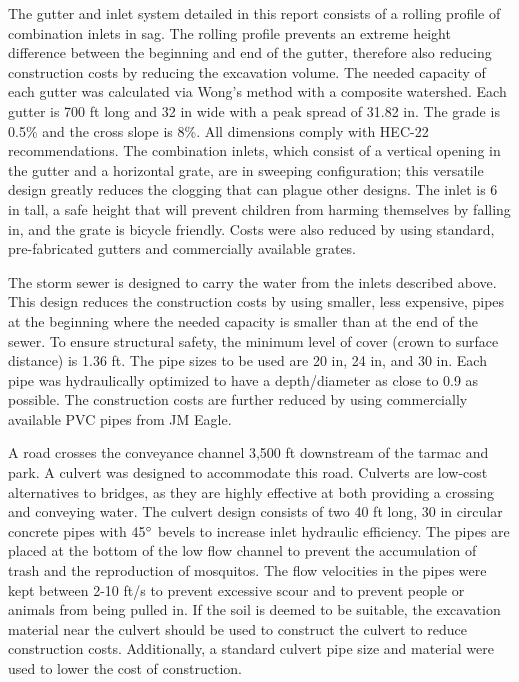 \documentclass[11pt,letterpaper,final]{report}
\begin{document}
The gutter and inlet system detailed in this report consists of a rolling profile of combination inlets in sag. The rolling profile prevents an extreme height difference between the beginning and end of the gutter, therefore also reducing construction costs by reducing the excavation volume. The needed capacity of each gutter was calculated via Wong's method with a composite watershed. Each gutter is 700 ft long and 32 in wide with a peak spread of 31.82 in. The grade is 0.5\% and the cross slope is 8\%. All dimensions comply with HEC-22 recommendations. The combination inlets, which consist of a vertical opening in the gutter and a horizontal grate, are in sweeping configuration; this versatile design greatly reduces the clogging that can plague other designs. The inlet is 6 in tall, a safe height that will prevent children from harming themselves by falling in, and the grate is bicycle friendly. Costs were also reduced by using standard, pre-fabricated gutters and commercially available grates.

The storm sewer is designed to carry the water from the inlets described above. This design reduces the construction costs by using smaller, less expensive, pipes at the beginning where the needed capacity is smaller than at the end of the sewer. To ensure structural safety, the minimum level of cover (crown to surface distance) is 1.36 ft. The pipe sizes to be used are 20 in, 24 in, and 30 in. Each pipe was hydraulically optimized to have a depth/diameter as close to 0.9 as possible. The construction costs are further reduced by using commercially available PVC pipes from JM Eagle.

A road crosses the conveyance channel 3,500 ft downstream of the tarmac and park. A culvert was designed to accommodate this road. Culverts are low-cost alternatives to bridges, as they are highly effective at both providing a crossing and conveying water. The culvert design consists of two 40 ft long, 30 in circular concrete pipes with 45$\degree$ bevels to increase inlet hydraulic efficiency. The pipes are placed at the bottom of the low flow channel to prevent the accumulation of trash and the reproduction of mosquitos. The flow velocities in the pipes were kept between 2-10 ft/s to prevent excessive scour and to prevent people or animals from being pulled in. If the soil is deemed to be suitable, the excavation material near the culvert should be used to construct the culvert to reduce construction costs. Additionally, a standard culvert pipe size and material were used to lower the cost of construction.
\end{document}
